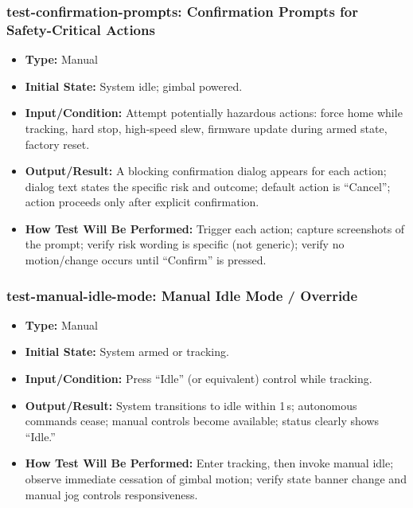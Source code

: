 \documentclass[12pt, titlepage]{article}
\begin{document}
\subsubsection*{test-confirmation-prompts: Confirmation Prompts for Safety-Critical Actions}
\begin{itemize}
  \item \textbf{Type:} Manual
  \item \textbf{Initial State:} System idle; gimbal powered.
  \item \textbf{Input/Condition:} Attempt potentially hazardous actions: force home while tracking, hard stop, high-speed slew, firmware update during armed state, factory reset.
  \item \textbf{Output/Result:} A blocking confirmation dialog appears for each action; dialog text states the specific risk and outcome; default action is “Cancel”; action proceeds only after explicit confirmation.
  \item \textbf{How Test Will Be Performed:} Trigger each action; capture screenshots of the prompt; verify risk wording is specific (not generic); verify no motion/change occurs until “Confirm” is pressed.
\end{itemize}

\subsubsection*{test-manual-idle-mode: Manual Idle Mode / Override}
\begin{itemize}
  \item \textbf{Type:} Manual
  \item \textbf{Initial State:} System armed or tracking.
  \item \textbf{Input/Condition:} Press “Idle” (or equivalent) control while tracking.
  \item \textbf{Output/Result:} System transitions to idle within 1\,s; autonomous commands cease; manual controls become available; status clearly shows “Idle.”
  \item \textbf{How Test Will Be Performed:} Enter tracking, then invoke manual idle; observe immediate cessation of gimbal motion; verify state banner change and manual jog controls responsiveness.
\end{itemize}
\end{document}
